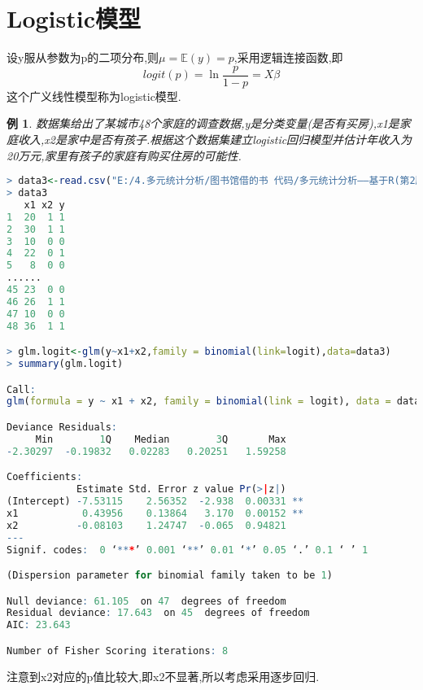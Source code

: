 \documentclass[11pt,a4paper,oneside]{book}
\newtheorem{e}{例}
\begin{document}
\section{Logistic模型}
设y服从参数为p的二项分布,则$ \mu=\mathbb{E}(y)=p $,采用逻辑连接函数,即\[logit(p)=\ln\frac{p}{1-p}=X\beta\]
这个广义线性模型称为logistic模型.
\begin{e}
数据集给出了某城市48个家庭的调查数据,y是分类变量(是否有买房),x1是家庭收入,x2是家中是否有孩子.根据这个数据集建立logistic回归模型并估计年收入为20万元,家里有孩子的家庭有购买住房的可能性.
\end{e}
\begin{lstlisting}[language=r]
> data3<-read.csv("E:/4.多元统计分析/图书馆借的书 代码/多元统计分析——基于R(第2版) R-data/eg3.1.csv",header=TRUE)
> data3
   x1 x2 y
1  20  1 1
2  30  1 1
3  10  0 0
4  22  0 1
5   8  0 0
......
45 23  0 0
46 26  1 1
47 10  0 0
48 36  1 1

> glm.logit<-glm(y~x1+x2,family = binomial(link=logit),data=data3)
> summary(glm.logit)

Call:
glm(formula = y ~ x1 + x2, family = binomial(link = logit), data = data3)

Deviance Residuals: 
     Min        1Q    Median        3Q       Max  
-2.30297  -0.19832   0.02283   0.20251   1.59258  

Coefficients:
            Estimate Std. Error z value Pr(>|z|)   
(Intercept) -7.53115    2.56352  -2.938  0.00331 **
x1           0.43956    0.13864   3.170  0.00152 **
x2          -0.08103    1.24747  -0.065  0.94821   
---
Signif. codes:  0 ‘***’ 0.001 ‘**’ 0.01 ‘*’ 0.05 ‘.’ 0.1 ‘ ’ 1

(Dispersion parameter for binomial family taken to be 1)

Null deviance: 61.105  on 47  degrees of freedom
Residual deviance: 17.643  on 45  degrees of freedom
AIC: 23.643

Number of Fisher Scoring iterations: 8
\end{lstlisting}
注意到x2对应的p值比较大,即x2不显著,所以考虑采用逐步回归.
\end{document}
